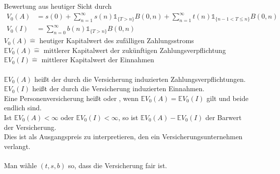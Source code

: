 Bewertung aus heutiger Sicht durch
\begin{equation*}
\begin{aligned}
	V_0(A) &= s(0)+\sum_{n=1}^{\infty}s(n) \mathbb{1}_{\{T>n\}}B(0,n)+\sum_{n=1}^{\infty}t(n)\mathbb{1}_{\{n-1<T\le n \}} B(0,n) \\
	V_0(I) &= \sum_{n=0}^{\infty}b(n)\mathbb{1}_{\{T>n\}} B(0,n)
\end{aligned}
\end{equation*}
$V_0(A) \mathrel{\hat{=}}$ heutiger Kapitalwert des zufälligen Zahlungsstroms\\
$\mathds{E}V_0(A) \mathrel{\hat{=}}$ mittlerer Kapitalwert der zukünftigen Zahlungsverpflichtung\\
$\mathds{E}V_0(I) \mathrel{\hat{=}}$ mittlerer Kapitalwert der Einnahmen\\
\\
$\mathds{E}V_0(A)$ heißt  der durch die Versicherung induzierten Zahlungsverpflichtungen. $\mathds{E}V_0(I)$ heißt  der durch die Versicherung induzierten Einnahmen.\\
Eine Personenversicherung heißt  oder , wenn $\mathds{E}V_0(A)=\mathds{E}V_0(I)$ gilt und beide endlich sind.\\
Ist $\mathds{E}V_0(A)<\infty$ oder $\mathds{E}V_0(I)<\infty$, so ist $\mathds{E}V_0(A)-\mathds{E}V_0(I)$ der Barwert der Versicherung.\\
Dies ist als Ausgangspreis zu interpretieren, den ein Versicherungsunternehmen verlangt.\\
\\
Man wähle $(t,s,b)$ so, dass die Versicherung fair ist.


